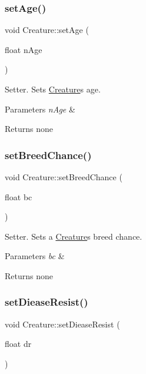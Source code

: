 \subsubsection{\texorpdfstring{set\+Age()}{setAge()}}
{\footnotesize\ttfamily void Creature\+::set\+Age (\begin{DoxyParamCaption}\item[{float}]{n\+Age }\end{DoxyParamCaption})}

Setter. Sets \hyperlink{class_creature}{Creature}\textquotesingle{}s age. 
\begin{DoxyParams}{Parameters}
{\em n\+Age} & \\
\hline
\end{DoxyParams}
\begin{DoxyReturn}{Returns}
none 
\end{DoxyReturn}
\mbox{\label{class_creature_aa0c973f2abb3cfad7c828b62baf80a33}} 
\subsubsection{\texorpdfstring{set\+Breed\+Chance()}{setBreedChance()}}
{\footnotesize\ttfamily void Creature\+::set\+Breed\+Chance (\begin{DoxyParamCaption}\item[{float}]{bc }\end{DoxyParamCaption})}

Setter. Sets a \hyperlink{class_creature}{Creature}\textquotesingle{}s breed chance. 
\begin{DoxyParams}{Parameters}
{\em bc} & \\
\hline
\end{DoxyParams}
\begin{DoxyReturn}{Returns}
none 
\end{DoxyReturn}
\mbox{\label{class_creature_a76623b331f8a5051c8ab6aa122ed3091}} 
\subsubsection{\texorpdfstring{set\+Diease\+Resist()}{setDieaseResist()}}
{\footnotesize\ttfamily void Creature\+::set\+Diease\+Resist (\begin{DoxyParamCaption}\item[{float}]{dr }\end{DoxyParamCaption})}

